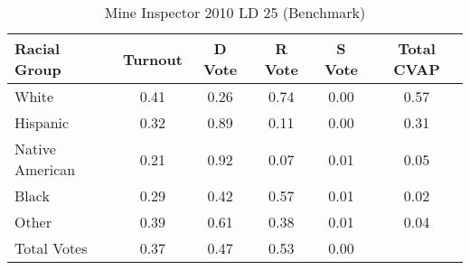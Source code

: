 \begin{table}[htb]
\begin{center}
\caption{Mine Inspector 2010 LD 25 (Benchmark)}
\label{smine_cvap_ld_25_benchmark}
\begin{tabular}{lccccc}
  \hline
Racial Group & Turnout & D Vote & R Vote & S Vote & Total CVAP \\ 
  \hline
White & 0.41 & 0.26 & 0.74 & 0.00 & 0.57 \\ 
  Hispanic & 0.32 & 0.89 & 0.11 & 0.00 & 0.31 \\ 
  Native American & 0.21 & 0.92 & 0.07 & 0.01 & 0.05 \\ 
  Black & 0.29 & 0.42 & 0.57 & 0.01 & 0.02 \\ 
  Other & 0.39 & 0.61 & 0.38 & 0.01 & 0.04 \\ 
  Total Votes & 0.37 & 0.47 & 0.53 & 0.00 &  \\ 
   \hline
\end{tabular}
\end{center}
\end{table}
